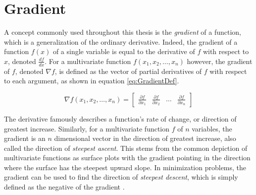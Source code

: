 \section{Gradient}\label{sec:Gradient}

A concept commonly used throughout this thesis is the \textit{gradient} of a function, which is a generalization of the ordinary derivative. Indeed, the gradient of a function $f(x)$ of a single variable is equal to the derivative of $f$ with respect to $x$, denoted $\frac{d f}{d x}$. For a multivariate function $f(x_1, x_2, \dots, x_n)$ however, the gradient of $f$, denoted $\nabla f$, is defined as the vector of partial derivatives of $f$ with respect to each argument, as shown in equation \ref{eq:GradientDef}.

\begin{equation}\label{eq:GradientDef}
    \nabla f(x_1, x_2, \dots, x_n) = \begin{bmatrix} \frac{\partial f}{\partial x_1} & \frac{\partial f}{\partial x_2} & \dots & \frac{\partial f}{\partial x_n} \end{bmatrix}
\end{equation}

The derivative famously describes a function's rate of change, or direction of greatest increase. Similarly, for a multivariate function $f$ of $n$ variables, the gradient is an $n$ dimensional vector in the direction of greatest increase, also called the direction of \textit{steepest ascent}. This stems from the common depiction of multivariate functions as surface plots with the gradient pointing in the direction where the surface has the steepest upward slope. In minimization problems, the gradient can be used to find the direction of \textit{steepest descent}, which is simply defined as the negative of the gradient \cite{faul_2020_a}.





